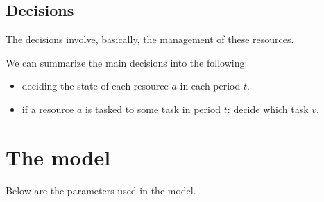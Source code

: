 \documentclass{roadef}
\begin{document}
    \subsection{Decisions}

    The decisions involve, basically, the management of these resources. 

    We can summarize the main decisions into the following:

    \begin{itemize}
        \item deciding the state of each resource $a$ in each period $t$.
        \item if a resource $a$ is tasked to some task in period $t$: decide which task $v$.
    \end{itemize}



\section{The model}

    Below are the parameters used in the model.
\end{document}
